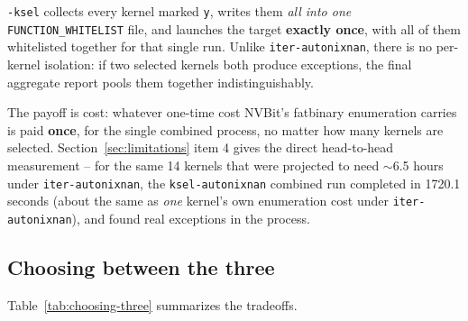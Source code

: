 \documentclass[11pt]{article}
\begin{document}
\texttt{-ksel} collects every kernel marked \texttt{y}, writes them
\emph{all into one} \texttt{FUNCTION\_WHITELIST} file, and launches the
target \textbf{exactly once}, with all of them whitelisted together for
that single run. Unlike \texttt{iter-autonixnan}, there is no
per-kernel isolation: if two selected kernels both produce exceptions,
the final aggregate report pools them together indistinguishably.

The payoff is cost: whatever one-time cost NVBit's fatbinary enumeration
carries is paid \textbf{once}, for the single combined process, no
matter how many kernels are selected. Section~\ref{sec:limitations}
item 4 gives the direct head-to-head measurement -- for the same 14
kernels that were projected to need $\sim$6.5 hours under
\texttt{iter-autonixnan}, the \texttt{ksel-autonixnan} combined run
completed in 1720.1 seconds (about the same as \emph{one} kernel's own
enumeration cost under \texttt{iter-autonixnan}), and found real
exceptions in the process.

\subsection{Choosing between the three}

Table~\ref{tab:choosing-three} summarizes the tradeoffs.
\end{document}
